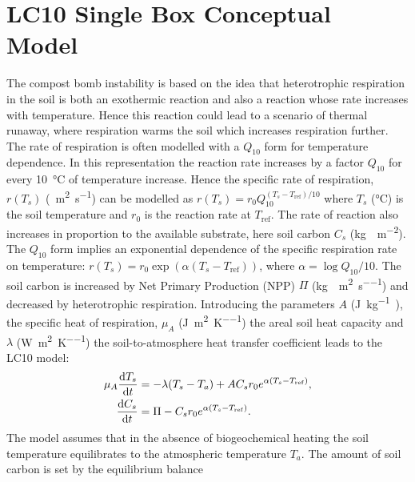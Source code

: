 \section{LC10 Single Box Conceptual Model}
\label{sec:lc10}
The compost bomb instability is based on the idea that heterotrophic respiration in the soil is both an exothermic reaction\cite{Thornley1971} and
also a reaction whose rate increases with temperature. Hence this reaction could lead to a scenario of thermal runaway, where respiration warms the soil which increases respiration further.
The rate of respiration is often modelled with a $Q_{10}$ form\cite{Kirschbaum1995} for temperature dependence.
In this representation the reaction rate increases by a factor $Q_{10}$
for every \SI{10}{\degreeCelsius} of temperature increase.
Hence the specific rate of respiration, $r(T_s)$ (\si{\per\square\meter\per\second}) can be modelled as $r(T_s) = r_0 Q_{10}^{\left(T_s - T_{\mathrm{ref}}\right)/10}$
where $T_s$ (\si{\degreeCelsius}) is the soil temperature and $r_0$ is the reaction rate at
$T_{\mathrm{ref}}$. The rate of reaction also increases in proportion to the available substrate, here soil carbon $C_s$ (\si{\kilo\gram\carbon\per\square\meter}).
The $Q_{10}$ form implies an exponential dependence of the specific respiration rate on temperature:  $r(T_s)=r_0 \exp\left(\alpha\left(T_s-T_{\mathrm{ref}}\right)\right)$, where
$\alpha = \log Q_{10}/10$. The soil carbon is increased by Net Primary Production (NPP)
$\Pi$ (\si{\kilo\gram\carbon\per\square\meter\per\second}) and decreased by heterotrophic respiration. Introducing the parameters $A$ (\si{\joule\per\kilo\gram\carbon}), the specific heat
of respiration, $\mu_A$ (\si{\joule\per\square\meter\per\kelvin}) the areal soil heat capacity and $\lambda$ (\si{\watt\per\square\meter\per\kelvin})
the soil-to-atmosphere heat transfer coefficient leads to the LC10 model:
\begin{subequations}

  \label{eq:lc10}
 \begin{align}
   \mu_A\dv{T_s}{t} &= -\lambda (T_s - T_a) + AC_sr_0e^{\alpha (T_s - T_{\mathrm{ref}})}, \label{subeq:lc10_temperature}\\
  \dv{C_s}{t} &= \Pi - C_sr_0e^{\alpha (T_s - T_{\mathrm{ref}})}.  \label{subeq:lc10_soil_carbon}
 \end{align}
\end{subequations}
The model assumes that in the absence of biogeochemical heating the soil temperature equilibrates to the atmospheric temperature $T_a$. The amount of soil carbon is set by the equilibrium balance
